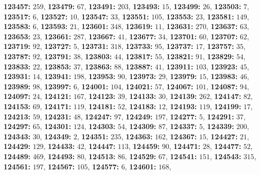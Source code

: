 \textsf{\bfseries 123457:} $259$, \textsf{\bfseries 123479:} $67$, \textsf{\bfseries 123491:} $203$, \textsf{\bfseries 123493:} $15$, \textsf{\bfseries 123499:} $26$, \textsf{\bfseries 123503:} $7$, \textsf{\bfseries 123517:} $6$, \textsf{\bfseries 123527:} $10$, \textsf{\bfseries 123547:} $33$, \textsf{\bfseries 123551:} $105$, \textsf{\bfseries 123553:} $23$, \textsf{\bfseries 123581:} $149$, \textsf{\bfseries 123583:} $6$, \textsf{\bfseries 123593:} $21$, \textsf{\bfseries 123601:} $348$, \textsf{\bfseries 123619:} $11$, \textsf{\bfseries 123631:} $270$, \textsf{\bfseries 123637:} $63$, \textsf{\bfseries 123653:} $23$, \textsf{\bfseries 123661:} $287$, \textsf{\bfseries 123667:} $41$, \textsf{\bfseries 123677:} $34$, \textsf{\bfseries 123701:} $60$, \textsf{\bfseries 123707:} $62$, \textsf{\bfseries 123719:} $92$, \textsf{\bfseries 123727:} $5$, \textsf{\bfseries 123731:} $318$, \textsf{\bfseries 123733:} $95$, \textsf{\bfseries 123737:} $17$, \textsf{\bfseries 123757:} $35$, \textsf{\bfseries 123787:} $92$, \textsf{\bfseries 123791:} $38$, \textsf{\bfseries 123803:} $44$, \textsf{\bfseries 123817:} $55$, \textsf{\bfseries 123821:} $91$, \textsf{\bfseries 123829:} $54$, \textsf{\bfseries 123833:} $22$, \textsf{\bfseries 123853:} $37$, \textsf{\bfseries 123863:} $88$, \textsf{\bfseries 123887:} $41$, \textsf{\bfseries 123911:} $103$, \textsf{\bfseries 123923:} $45$, \textsf{\bfseries 123931:} $14$, \textsf{\bfseries 123941:} $198$, \textsf{\bfseries 123953:} $90$, \textsf{\bfseries 123973:} $29$, \textsf{\bfseries 123979:} $15$, \textsf{\bfseries 123983:} $46$, \textsf{\bfseries 123989:} $98$, \textsf{\bfseries 123997:} $6$, \textsf{\bfseries 124001:} $104$, \textsf{\bfseries 124021:} $57$, \textsf{\bfseries 124067:} $101$, \textsf{\bfseries 124087:} $94$, \textsf{\bfseries 124097:} $24$, \textsf{\bfseries 124121:} $167$, \textsf{\bfseries 124123:} $39$, \textsf{\bfseries 124133:} $30$, \textsf{\bfseries 124139:} $262$, \textsf{\bfseries 124147:} $82$, \textsf{\bfseries 124153:} $69$, \textsf{\bfseries 124171:} $119$, \textsf{\bfseries 124181:} $52$, \textsf{\bfseries 124183:} $12$, \textsf{\bfseries 124193:} $119$, \textsf{\bfseries 124199:} $17$, \textsf{\bfseries 124213:} $59$, \textsf{\bfseries 124231:} $48$, \textsf{\bfseries 124247:} $97$, \textsf{\bfseries 124249:} $197$, \textsf{\bfseries 124277:} $5$, \textsf{\bfseries 124291:} $37$, \textsf{\bfseries 124297:} $65$, \textsf{\bfseries 124301:} $124$, \textsf{\bfseries 124303:} $54$, \textsf{\bfseries 124309:} $87$, \textsf{\bfseries 124337:} $5$, \textsf{\bfseries 124339:} $200$, \textsf{\bfseries 124343:} $30$, \textsf{\bfseries 124349:} $2$, \textsf{\bfseries 124351:} $235$, \textsf{\bfseries 124363:} $162$, \textsf{\bfseries 124367:} $15$, \textsf{\bfseries 124427:} $21$, \textsf{\bfseries 124429:} $129$, \textsf{\bfseries 124433:} $42$, \textsf{\bfseries 124447:} $113$, \textsf{\bfseries 124459:} $90$, \textsf{\bfseries 124471:} $28$, \textsf{\bfseries 124477:} $52$, \textsf{\bfseries 124489:} $469$, \textsf{\bfseries 124493:} $80$, \textsf{\bfseries 124513:} $86$, \textsf{\bfseries 124529:} $67$, \textsf{\bfseries 124541:} $151$, \textsf{\bfseries 124543:} $315$, \textsf{\bfseries 124561:} $197$, \textsf{\bfseries 124567:} $105$, \textsf{\bfseries 124577:} $6$, \textsf{\bfseries 124601:} $168$, 
